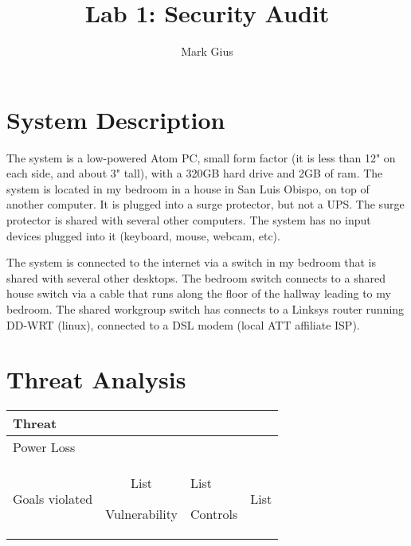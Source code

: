 \documentclass[11pt]{article}
\begin{document}
%
\author{Mark Gius}
\title{Lab 1: Security Audit}
\maketitle

\section{System Description}

The system is a low-powered Atom PC, small form factor 
(it is less than 12" on each side, and about 3" tall), 
with a 320GB hard drive and 2GB of ram.  
The system is located in my bedroom in a house in San Luis Obispo, 
on top of another computer.  It is plugged into a surge protector, 
but not a UPS.  The surge protector is shared with several other computers.
The system has no input devices plugged into it 
(keyboard, mouse, webcam, etc).

The system is connected to the internet via a switch in my bedroom 
that is shared with several other desktops. The bedroom switch connects 
to a shared house switch via a cable that runs along the floor of 
the hallway leading to my bedroom.  The shared workgroup switch 
has connects to a Linksys router running DD-WRT (linux), connected to 
a DSL modem (local ATT affiliate ISP).

\section{Threat Analysis}

\begin{tabular}{l || c | l}
	\hline
	\textbf{Threat} \\
	\hline
	Power Loss & \\
		Goals violated & List
		\cline{2-3}
		Vulnerability & List
		\cline{2-3}
		Controls & List

\end{tabular}
\end{document}
